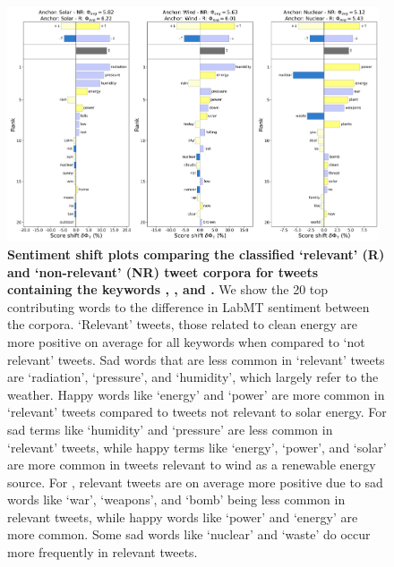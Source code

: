 \begin{figure}
  \centering	
    \includegraphics[width=0.98\textwidth]{figures/combined_shifts.png}  
  \caption{
    \textbf{Sentiment shift plots comparing the classified `relevant' (R) and `non-relevant' (NR) tweet corpora for tweets containing the keywords , , and .}
    We show the 20 top contributing words to the difference in LabMT sentiment between the corpora.
    `Relevant' tweets, those related to clean energy
    are more positive on average for all keywords
    when compared to `not relevant' tweets. 
    Sad words that are less common in `relevant'  tweets are `radiation', `pressure', and `humidity', which largely refer to the weather.
    Happy words like `energy' and `power' are more common in `relevant' tweets compared to tweets not relevant to solar energy. For  sad terms like `humidity' and `pressure' are less common in `relevant' tweets,
    while happy terms like `energy', `power', and `solar' are more common in tweets relevant to wind as a renewable energy source. 
    For , relevant tweets are on average more positive due to sad words like `war', `weapons', and `bomb' being less common in relevant tweets,
    while happy words like `power' and `energy' are more common.
    Some sad words like `nuclear' and `waste' do occur more frequently in relevant tweets.
  }    
  \label{fig:combined_sentiment_shifts}
\end{figure}


